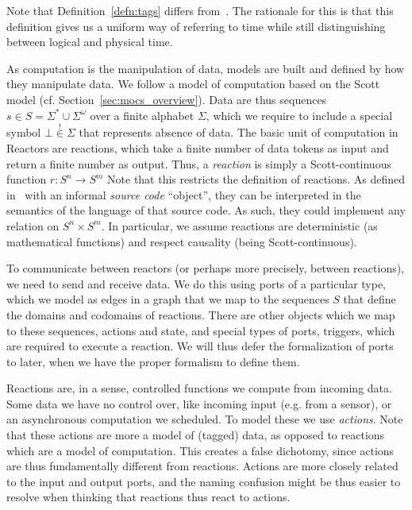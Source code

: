 Note that Definition~\ref{defn:tags} differs from~\cite{lohstroh_cyphy19,lohstroh_phdthesis}.
The rationale for this is that this definition gives us a uniform way of referring to time while still distinguishing between logical and physical time.

As computation is the manipulation of data, models are built and defined by how they manipulate data.
We follow a model of computation based on the Scott model (cf. Section~\ref{sec:mocs_overview}).
Data are thus sequences $s \in S = \Sigma^* \cup \Sigma^\omega$ over a finite alphabet $\Sigma$, which we require to include a special symbol $\bot \overset{!}{\in} \Sigma$ that represents absence of data.
The basic unit of computation in Reactors are reactions, which take a finite number of data tokens as input and return a finite number as output.
Thus, a \emph{reaction} is simply a Scott-continuous function $r : S^n \rightarrow S^m$
Note that this restricts the definition of reactions.
As defined in~\cite{lohstroh_cyphy19} with an informal \emph{source code} ``object'', they can be interpreted in the semantics of the language of that source code.
As such, they could implement any relation on $S^n \times S^m$.
In particular, we assume reactions are deterministic (as mathematical functions) and respect causality (being Scott-continuous).

To communicate between reactors (or perhaps more precisely, between reactions), we need to send and receive data.
We do this using ports of a particular type, which we model as edges in a graph that we map to the sequences $S$ that define the domains and codomains of reactions.
There are other objects which we map to these sequences, actions and state, and special types of ports, triggers, which are required to execute a reaction.
We will thus defer the formalization of ports to later, when we have the proper formalism to define them.


Reactions are, in a sense, controlled functions we compute from incoming data. 
Some data we have no control over, like incoming input (e.g. from a sensor), or an asynchronous computation we scheduled.
To model these we use \emph{actions}.
Note that these actions are more a model of (tagged) data, as opposed to reactions which are a model of computation.
This creates a false dichotomy, since actions are thus fundamentally different from reactions.
Actions are more closely related to the input and output ports, and the naming confusion might be thus easier to resolve when thinking that reactions thus react to actions.

